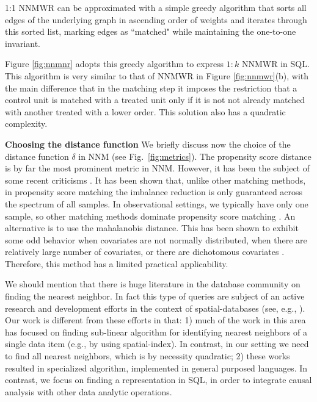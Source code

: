 {{1:1 NNMWR can be approximated with a simple greedy algorithm that
sorts all edges of the underlying graph in ascending order of weights
and iterates through this sorted list, marking edges as ``matched"
while maintaining the one-to-one invariant.  Figure \ref{fig:nnmnr} adopts this greedy algorithm to
express $1:k$ NNMWR in SQL.  This algorithm is very similar to that of
NNMWR in Figure \ref{fig:nnmwr}(b), with the main difference that in
the matching step it imposes the restriction that a control unit is
matched with a treated unit only if it is not not already matched with
another treated with a lower order.  This solution also has a
quadratic complexity.

{\bf Choosing the distance function} We briefly discuss now the choice
of the distance function $\delta$ in NNM (see Fig.~\ref{fig:metrics}).
The propensity score distance is by far the most prominent metric in
NNM.  However, it has been the subject of some recent criticisms
\cite{king15}.  It has been shown that, unlike other matching methods,
in propensity score matching the imbalance reduction is only
guaranteed across the spectrum of all samples. In observational
settings, we typically have only one sample, so other matching methods
dominate propensity score matching \cite{king15}. An alternative is to use the mahalanobis distance.  This has been
shown to exhibit some odd behavior when covariates are not normally
distributed, when there are relatively large number of covariates, or
there are dichotomous covariates
\cite{rosenbaum2002observational}. Therefore, this method has a
limited practical applicability.


We should mention that there is huge literature in the database
community on finding the nearest neighbor. In fact this type of
queries are subject of an active research and development efforts in
the context of spatial-databases (see, e.g.,
\cite{obe2015postgis}). Our work is different from these efforts in that: 1) much of the work in this area has focused on finding sub-linear algorithm for identifying nearest neighbors of a single data item (e.g., by using spatial-index). In contrast, in our setting
we need to find all nearest neighbors, which is by necessity quadratic; 2) these works resulted in specialized algorithm,
implemented in general purposed languages. In contrast, we focus on finding a representation in SQL, in order to integrate causal
 analysis with other data analytic operations.  

}}
